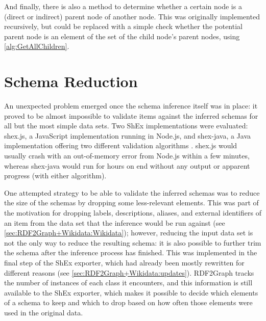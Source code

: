 And finally, there is also a method to determine whether a certain node is a (direct or indirect) parent node of another node.
This was originally implemented recursively,
but could be replaced with a simple check whether the potential parent node is an element of the set of the child node’s parent nodes,
using \cref{alg:GetAllChildren}.

\section{Schema Reduction}
\label{sec:RDF2Graph+Wikidata:schema-reduction}

An unexpected problem emerged once the schema inference itself was in place: %
it proved to be almost impossible to validate items against the inferred schemas
for all but the most simple data sets.
Two ShEx implementations were evaluated:
shex.js, %
a JavaScript implementation running in Node.js,
and shex-java,
a Java implementation offering two different validation algorithms \cite{boneva:hal-01590350}.
shex.js would usually crash with an out-of-memory error from Node.js within a few minutes,
whereas shex-java would run for hours on end without any output or apparent progress
(with either algorithm).

One attempted strategy to be able to validate the inferred schemas %
was to reduce the size of the schemas by dropping some less-relevant elements.
This was part of the motivation for dropping labels, descriptions, aliases, and external identifiers of an item
from the data set that the inference would be run against
(see \cref{sec:RDF2Graph+Wikidata:Wikidata});
however, reducing the input data set is not the only way to reduce the resulting schema:
it is also possible to further trim the schema after the inference process has finished.
This was implemented in the final step of the ShEx exporter, %
which had already been mostly rewritten for different reasons
(see \cref{sec:RDF2Graph+Wikidata:updates}).
RDF2Graph tracks the number of instances of each class it encounters,
and this information is still available to the ShEx exporter,
which makes it possible to decide which elements of a schema to keep and which to drop
based on how often those elements were used in the original data. %

